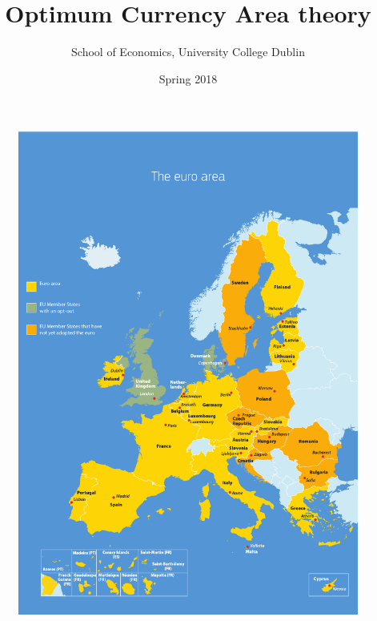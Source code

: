 \documentclass{beamer}
\title{Optimum Currency Area theory}
\author{School of Economics, University College Dublin}
\date{Spring 2018}
\begin{document}
\begin{frame}
 \titlepage
\end{frame}

\begin{frame}
  \begin{figure}
    \includegraphics[scale=.3]{eurozone.eps}
  \end{figure}
\end{frame}
\end{document}
